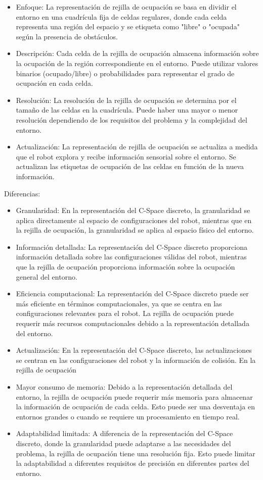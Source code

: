 \documentclass{article}
\begin{document}
\begin{itemize}
\begin{itemize}
\item Enfoque: La representación de rejilla de ocupación se basa en dividir el entorno en una cuadrícula fija de celdas regulares, donde cada celda representa una región del espacio y se etiqueta como "libre" o "ocupada" según la presencia de obstáculos.
\item Descripción: Cada celda de la rejilla de ocupación almacena información sobre la ocupación de la región correspondiente en el entorno. Puede utilizar valores binarios (ocupado/libre) o probabilidades para representar el grado de ocupación en cada celda.
\item Resolución: La resolución de la rejilla de ocupación se determina por el tamaño de las celdas en la cuadrícula. Puede haber una mayor o menor resolución dependiendo de los requisitos del problema y la complejidad del entorno.
\item Actualización: La representación de rejilla de ocupación se actualiza a medida que el robot explora y recibe información sensorial sobre el entorno. Se actualizan las etiquetas de ocupación de las celdas en función de la nueva información.
\end{itemize}

Diferencias:

\begin{itemize}
\item Granularidad: En la representación del C-Space discreto, la granularidad se aplica directamente al espacio de configuraciones del robot, mientras que en la rejilla de ocupación, la granularidad se aplica al espacio físico del entorno.
\item Información detallada: La representación del C-Space discreto proporciona información detallada sobre las configuraciones válidas del robot, mientras que la rejilla de ocupación proporciona información sobre la ocupación general del entorno.
\item Eficiencia computacional: La representación del C-Space discreto puede ser más eficiente en términos computacionales, ya que se centra en las configuraciones relevantes para el robot. La rejilla de ocupación puede requerir más recursos computacionales debido a la representación detallada del entorno.
\item Actualización: En la representación del C-Space discreto, las actualizaciones se centran en las configuraciones del robot y la información de colisión. En la rejilla de ocupación
\item Mayor consumo de memoria: Debido a la representación detallada del entorno, la rejilla de ocupación puede requerir más memoria para almacenar la información de ocupación de cada celda. Esto puede ser una desventaja en entornos grandes o cuando se requiere un procesamiento en tiempo real.
\item Adaptabilidad limitada: A diferencia de la representación del C-Space discreto, donde la granularidad puede adaptarse a las necesidades del problema, la rejilla de ocupación tiene una resolución fija. Esto puede limitar la adaptabilidad a diferentes requisitos de precisión en diferentes partes del entorno.
\end{itemize}


\end{itemize}
\end{document}
